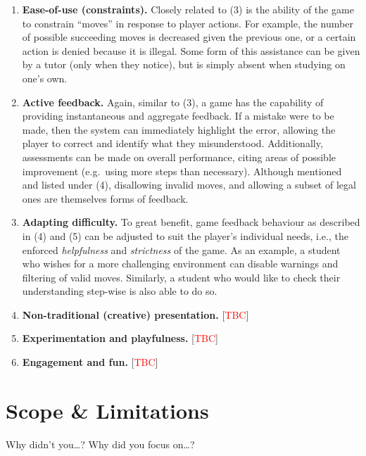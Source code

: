 \documentclass[a4paper]{article}
\newcommand{\comment}[1]{[\textcolor{red}{#1}]} %
\begin{document}
\begin{enumerate}
  \item \textbf{Ease-of-use (constraints).} Closely related to (3) is the ability of the game to constrain ``moves'' in response to player actions. For example, the number of possible succeeding moves is decreased given the previous one, or a certain action is denied because it is illegal. Some form of this assistance can be given by a tutor (only when they notice), but is simply absent when studying on one's own.
  \item \textbf{Active feedback.} Again, similar to (3), a game has the capability of providing instantaneous and aggregate feedback. If a mistake were to be made, then the system can immediately highlight the error, allowing the player to correct and identify what they misunderstood. Additionally, assessments can be made on overall performance, citing areas of possible improvement (e.g.\ using more steps than necessary). Although mentioned and listed under (4), disallowing invalid moves, and allowing a subset of legal ones are themselves forms of feedback.
  \item \textbf{Adapting difficulty.} To great benefit, game feedback behaviour as described in (4) and (5) can be adjusted to suit the player's individual needs, i.e., the enforced \emph{helpfulness} and \emph{strictness} of the game. As an example, a student who wishes for a more challenging environment can disable warnings and filtering of valid moves. Similarly, a student who would like to check their understanding step-wise is also able to do so.
  \item \textbf{Non-traditional (creative) presentation.} \comment{TBC}
  \item \textbf{Experimentation and playfulness.} \comment{TBC} %
  \item \textbf{Engagement and fun.} \comment{TBC}
\end{enumerate}

\section{Scope \& Limitations} %
Why didn't you\dots? Why did you focus on\dots?
\end{document}
